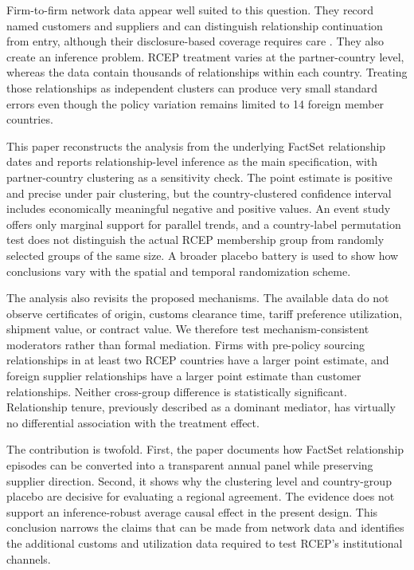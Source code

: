 \documentclass[preprint,12pt,authoryear]{elsarticle}
\begin{document}
Firm-to-firm network data appear well suited to this question. They record named customers and suppliers and can distinguish relationship continuation from entry, although their disclosure-based coverage requires care \citep{culot2022}. They also create an inference problem. RCEP treatment varies at the partner-country level, whereas the data contain thousands of relationships within each country. Treating those relationships as independent clusters can produce very small standard errors even though the policy variation remains limited to 14 foreign member countries.

This paper reconstructs the analysis from the underlying FactSet relationship dates and reports relationship-level inference as the main specification, with partner-country clustering as a sensitivity check. The point estimate is positive and precise under pair clustering, but the country-clustered confidence interval includes economically meaningful negative and positive values. An event study offers only marginal support for parallel trends, and a country-label permutation test does not distinguish the actual RCEP membership group from randomly selected groups of the same size. A broader placebo battery is used to show how conclusions vary with the spatial and temporal randomization scheme.

The analysis also revisits the proposed mechanisms. The available data do not observe certificates of origin, customs clearance time, tariff preference utilization, shipment value, or contract value. We therefore test mechanism-consistent moderators rather than formal mediation. Firms with pre-policy sourcing relationships in at least two RCEP countries have a larger point estimate, and foreign supplier relationships have a larger point estimate than customer relationships. Neither cross-group difference is statistically significant. Relationship tenure, previously described as a dominant mediator, has virtually no differential association with the treatment effect.

The contribution is twofold. First, the paper documents how FactSet relationship episodes can be converted into a transparent annual panel while preserving supplier direction. Second, it shows why the clustering level and country-group placebo are decisive for evaluating a regional agreement. The evidence does not support an inference-robust average causal effect in the present design. This conclusion narrows the claims that can be made from network data and identifies the additional customs and utilization data required to test RCEP's institutional channels.
\end{document}
